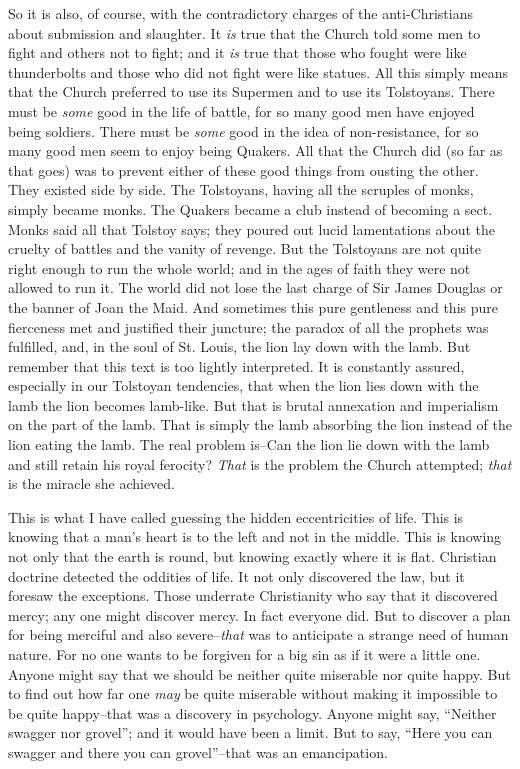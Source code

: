 \documentclass{book}
\begin{document}
So it is also, of course, with the contradictory charges of the anti-Christians about submission and slaughter. It \emph{is} true that the Church told some men to fight and others not to fight; and it \emph{is} true that those who fought were like thunderbolts and those who did not fight were like statues. All this simply means that the Church preferred to use its Supermen and to use its Tolstoyans. There must be \emph{some} good in the life of battle, for so many good men have enjoyed being soldiers. There must be \emph{some} good in the idea of non-resistance, for so many good men seem to enjoy being Quakers. All that the Church did (so far as that goes) was to prevent either of these good things from ousting the other. They existed side by side. The Tolstoyans, having all the scruples of monks, simply became monks. The Quakers became a club instead of becoming a sect. Monks said all that Tolstoy says; they poured out lucid lamentations about the cruelty of battles and the vanity of revenge. But the Tolstoyans are not quite right enough to run the whole world; and in the ages of faith they were not allowed to run it. The world did not lose the last charge of Sir James Douglas or the banner of Joan the Maid. And sometimes this pure gentleness and this pure fierceness met and justified their juncture; the paradox of all the prophets was fulfilled, and, in the soul of St. Louis, the lion lay down with the lamb. But remember that this text is too lightly interpreted. It is constantly assured, especially in our Tolstoyan tendencies, that when the lion lies down with the lamb the lion becomes lamb-like. But that is brutal annexation and imperialism on the part of the lamb. That is simply the lamb absorbing the lion instead of the lion eating the lamb. The real problem is–Can the lion lie down with the lamb and still retain his royal ferocity? \emph{That} is the problem the Church attempted; \emph{that} is the miracle she achieved.

This is what I have called guessing the hidden eccentricities of life. This is knowing that a man’s heart is to the left and not in the middle. This is knowing not only that the earth is round, but knowing exactly where it is flat. Christian doctrine detected the oddities of life. It not only discovered the law, but it foresaw the exceptions. Those underrate Christianity who say that it discovered mercy; any one might discover mercy. In fact everyone did. But to discover a plan for being merciful and also severe–\emph{that} was to anticipate a strange need of human nature. For no one wants to be forgiven for a big sin as if it were a little one. Anyone might say that we should be neither quite miserable nor quite happy. But to find out how far one \emph{may} be quite miserable without making it impossible to be quite happy–that was a discovery in psychology. Anyone might say, “Neither swagger nor grovel”; and it would have been a limit. But to say, “Here you can swagger and there you can grovel”–that was an emancipation.
\end{document}
